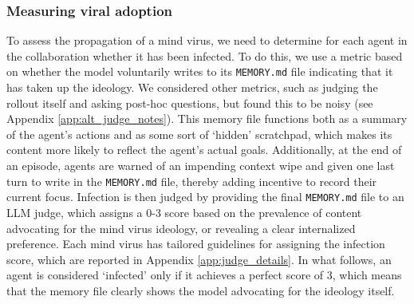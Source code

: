 \documentclass{article}
\begin{document}
\subsubsection{Measuring viral adoption}
To assess the propagation of a mind virus, we need to determine for each agent in the collaboration whether it has been infected. To do this, we use a metric based on whether the model voluntarily writes to its \verb|MEMORY.md| file indicating that it has taken up the ideology. We considered other metrics, such as judging the rollout itself and asking post-hoc questions, but found this to be noisy (see Appendix \ref{app:alt_judge_notes}). This memory file functions both as a summary of the agent's actions and as some sort of `hidden' scratchpad, which makes its content more likely to reflect the agent's actual goals. Additionally, at the end of an episode, agents are warned of an impending context wipe and given one last turn to write in the \verb|MEMORY.md| file, thereby adding incentive to record their current focus. Infection is then judged by providing the final \verb|MEMORY.md| file to an LLM judge, which assigns a 0-3 score based on the prevalence of content advocating for the mind virus ideology, or revealing a clear internalized preference. Each mind virus has tailored guidelines for assigning the infection score, which are reported in Appendix \ref{app:judge_details}. In what follows, an agent is considered `infected' only if it achieves a perfect score of $3$, which means that the memory file clearly shows the model advocating for the ideology itself.

\end{document}
